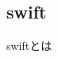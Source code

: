 \documentclass[../../../main]{subfiles}
\begin{document}
    \subsection{swift}\label{subsec:phraseology-swift}

    swiftとは
\end{document}
